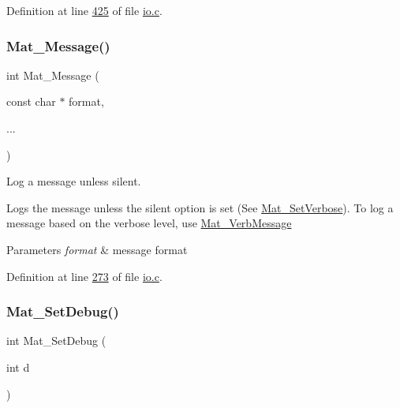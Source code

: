 Definition at line \hyperlink{io_8c_source_l00425}{425} of file \hyperlink{io_8c_source}{io.\+c}.

\mbox{\label{group__mat__util_gae7dfa394b111bc908a616f8f5bddaa97}} 
\subsubsection{\texorpdfstring{Mat\+\_\+\+Message()}{Mat\_Message()}}
{\footnotesize\ttfamily int Mat\+\_\+\+Message (\begin{DoxyParamCaption}\item[{const char $\ast$}]{format,  }\item[{}]{... }\end{DoxyParamCaption})}



Log a message unless silent. 

Logs the message unless the silent option is set (See \hyperlink{group__mat__util_gaf348b811ee26bfc923924878cea3c9ba}{Mat\+\_\+\+Set\+Verbose}). To log a message based on the verbose level, use \hyperlink{group__mat__util_ga64a176ea7e27e38d4242a24f3e3bad24}{Mat\+\_\+\+Verb\+Message}


\begin{DoxyParams}{Parameters}
{\em format} & message format \\
\hline
\end{DoxyParams}


Definition at line \hyperlink{io_8c_source_l00273}{273} of file \hyperlink{io_8c_source}{io.\+c}.

\mbox{\label{group__mat__util_gad75e2962dcaf2ac366f2420bb5b13094}} 
\subsubsection{\texorpdfstring{Mat\+\_\+\+Set\+Debug()}{Mat\_SetDebug()}}
{\footnotesize\ttfamily int Mat\+\_\+\+Set\+Debug (\begin{DoxyParamCaption}\item[{int}]{d }\end{DoxyParamCaption})}



